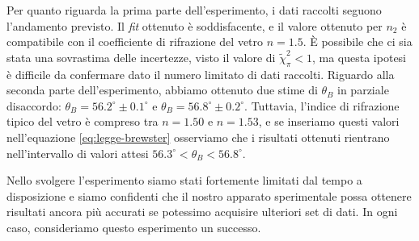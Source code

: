 Per quanto riguarda la prima parte dell'esperimento, i dati raccolti seguono l'andamento
previsto. Il \emph{fit} ottenuto è soddisfacente, e
il valore ottenuto per $n_2$ è compatibile con il coefficiente di rifrazione del
vetro $n = 1.5$.
È possibile che ci sia stata una sovrastima delle incertezze, visto il valore di
$\tilde \chi^2_\pi < 1$, ma questa ipotesi è difficile da confermare dato il numero
limitato di dati raccolti.
Riguardo alla seconda parte dell'esperimento, abbiamo ottenuto due stime di
$\theta_B$ in parziale disaccordo: $\theta_B = 56.2^\circ \pm 0.1^\circ$ e $\theta_B = 56.8^\circ \pm 0.2^\circ$.
Tuttavia, l'indice di rifrazione tipico del vetro è compreso tra $n=1.50$ e $n=1.53$, e se
inseriamo questi valori nell'equazione \eqref{eq:legge-brewster} osserviamo che i risultati
ottenuti rientrano nell'intervallo di valori attesi $56.3^\circ < \theta_{B} < 56.8^\circ$.

Nello svolgere l'esperimento siamo stati fortemente limitati dal tempo a disposizione
e siamo confidenti che il nostro apparato sperimentale possa ottenere risultati ancora
più accurati se potessimo acquisire ulteriori set di dati. In ogni caso, consideriamo
questo esperimento un successo.
\endinput
